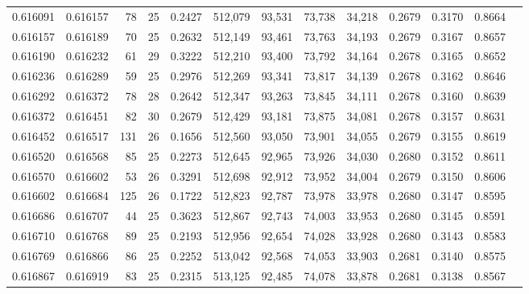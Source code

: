 \begin{tabular}{rrrrrrrrrrrrr}
0.616091 & 0.616157 &  78 &  25 &                                     0.2427 & 512,079 &  93,531 &  73,738 &  34,218 & 0.2679 & 0.3170 & 0.8664 \\
0.616157 & 0.616189 &  70 &  25 &                                     0.2632 & 512,149 &  93,461 &  73,763 &  34,193 & 0.2679 & 0.3167 & 0.8657 \\
0.616190 & 0.616232 &  61 &  29 &                                     0.3222 & 512,210 &  93,400 &  73,792 &  34,164 & 0.2678 & 0.3165 & 0.8652 \\
0.616236 & 0.616289 &  59 &  25 &                                     0.2976 & 512,269 &  93,341 &  73,817 &  34,139 & 0.2678 & 0.3162 & 0.8646 \\
0.616292 & 0.616372 &  78 &  28 &                                     0.2642 & 512,347 &  93,263 &  73,845 &  34,111 & 0.2678 & 0.3160 & 0.8639 \\
0.616372 & 0.616451 &  82 &  30 &                                     0.2679 & 512,429 &  93,181 &  73,875 &  34,081 & 0.2678 & 0.3157 & 0.8631 \\
0.616452 & 0.616517 & 131 &  26 &                                     0.1656 & 512,560 &  93,050 &  73,901 &  34,055 & 0.2679 & 0.3155 & 0.8619 \\
0.616520 & 0.616568 &  85 &  25 &                                     0.2273 & 512,645 &  92,965 &  73,926 &  34,030 & 0.2680 & 0.3152 & 0.8611 \\
0.616570 & 0.616602 &  53 &  26 &                                     0.3291 & 512,698 &  92,912 &  73,952 &  34,004 & 0.2679 & 0.3150 & 0.8606 \\
0.616602 & 0.616684 & 125 &  26 &                                     0.1722 & 512,823 &  92,787 &  73,978 &  33,978 & 0.2680 & 0.3147 & 0.8595 \\
0.616686 & 0.616707 &  44 &  25 &                                     0.3623 & 512,867 &  92,743 &  74,003 &  33,953 & 0.2680 & 0.3145 & 0.8591 \\
0.616710 & 0.616768 &  89 &  25 &                                     0.2193 & 512,956 &  92,654 &  74,028 &  33,928 & 0.2680 & 0.3143 & 0.8583 \\
0.616769 & 0.616866 &  86 &  25 &                                     0.2252 & 513,042 &  92,568 &  74,053 &  33,903 & 0.2681 & 0.3140 & 0.8575 \\
0.616867 & 0.616919 &  83 &  25 &                                     0.2315 & 513,125 &  92,485 &  74,078 &  33,878 & 0.2681 & 0.3138 & 0.8567 \\

\end{tabular}
